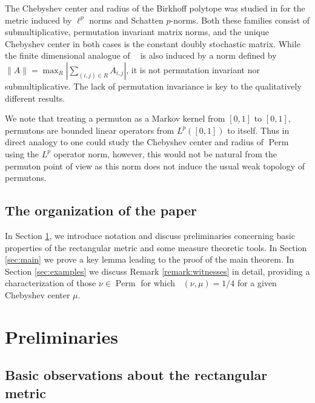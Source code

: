 \documentclass{article}
\newcommand{\Perm}{\mathop{\mathrm{Perm}}}
\newcommand{\ds}{\mathop{d_\square}}
\theoremstyle{definition}
\begin{document}
The Chebyshev center and radius of the Birkhoff polytope was studied in \cite{Bouthat2025, Bouthat2025_2} for the metric induced by $\ell^p$ norms and Schatten $p$-norms. Both these families consist of submultiplicative, permutation invariant matrix norms, and the unique Chebyshev center in both cases is the constant doubly stochastic matrix. While the finite dimensional analogue of $\ds$ is also induced by a norm defined by $\|A\| = \max_R \left|\sum_{(i, j)\in R}A_{i, j}\right|$, it is not permutation invariant nor submultiplicative. The lack of permutation invariance is key to the qualitatively different results.

We note that treating a permuton as a Markov kernel from $[0, 1]$ to $[0, 1]$, permutons are bounded linear operators from $L^p([0, 1])$ to itself. Thus in direct analogy to \cite{Bouthat2025} one could study the Chebyshev center and radius of $\Perm$ using the $L^p$ operator norm, however, this would not be natural from the permuton point of view as this norm does not induce the usual weak topology of permutons.

\subsection{The organization of the paper}
In Section \ref{sec:prelim}, we introduce notation and discuss preliminaries concerning 
basic properties of the rectangular metric and some measure theoretic tools. In Section \ref{sec:main} we prove a key lemma leading to the proof of the main theorem. In Section \ref{sec:examples} we discuss Remark \ref{remark:witnesses} in detail, providing a characterization of those $\nu\in\Perm$ for which $\ds(\nu, \mu)=1/4$ for a given Chebyshev center $\mu$.

\section{Preliminaries} \label{sec:prelim}

\subsection{Basic observations about the rectangular metric}
\end{document}
